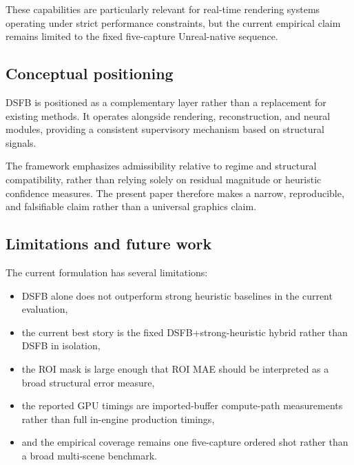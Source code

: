 \documentclass[11pt,letterpaper]{article}
\theoremstyle{gcresult}
\theoremstyle{definition}
\begin{document}
These capabilities are particularly relevant for real-time rendering systems operating under strict performance constraints, but the current empirical claim remains limited to the fixed five-capture Unreal-native sequence.


\subsection{Conceptual positioning}

DSFB is positioned as a complementary layer rather than a replacement for existing methods. It operates alongside rendering, reconstruction, and neural modules, providing a consistent supervisory mechanism based on structural signals.

The framework emphasizes admissibility relative to regime and structural compatibility, rather than relying solely on residual magnitude or heuristic confidence measures. The present paper therefore makes a narrow, reproducible, and falsifiable claim rather than a universal graphics claim.


\subsection{Limitations and future work}

The current formulation has several limitations:

\begin{itemize}[leftmargin=1.5em]
    \item DSFB alone does not outperform strong heuristic baselines in the current evaluation,
    \item the current best story is the fixed DSFB+strong-heuristic hybrid rather than DSFB in isolation,
    \item the ROI mask is large enough that ROI MAE should be interpreted as a broad structural error measure,
    \item the reported GPU timings are imported-buffer compute-path measurements rather than full in-engine production timings,
    \item and the empirical coverage remains one five-capture ordered shot rather than a broad multi-scene benchmark.
\end{itemize}
\end{document}
